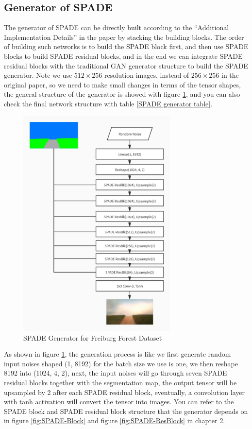 \subsection{Generator of SPADE}
The generator of SPADE can be directly built according to the “Additional Implementation Details”
in the paper \cite{park2019SPADE} by stacking the building blocks. The order of building 
such networks is to build the SPADE block first, and then use SPADE blocks to build SPADE residual 
blocks, and in the end we can integrate SPADE residual blocks with the traditional GAN generator 
structure to build the SPADE generator. Note we use $512\times256$ resolution images, 
instead of $256\times256$ in the original paper, so we need 
to make small changes in terms of the tensor shapes, 
the general structure of the generator is showed with figure \ref{fig:SPADE-imp-generator}, 
and you can also check the final network structure with table \ref{SPADE generator table}. 
\begin{figure}
    \begin{center}
    \includegraphics[width=8cm]{figures/SPADE-imp-generator}
    \end{center}
    \caption{SPADE Generator for Freiburg Forest Dataset}
    \label{fig:SPADE-imp-generator}
\end{figure} 

As shown in figure \ref{fig:SPADE-imp-generator}, the generation process is like we first 
generate random input noises shaped (1, 8192) for the batch size we use is one, we then 
reshape 8192 into (1024, 4, 2), next, the input noises will go through seven SPADE residual blocks 
together with the segmentation map, the output tensor will be upsampled 
by 2 after each SPADE residual block, eventually, a convolution layer with tanh activation 
will convert the tensor into images. You can refer to the SPADE block and SPADE residual block 
structure that the generator depends on in figure \ref{fig:SPADE-Block} and 
figure \ref{fig:SPADE-ResBlock} in chapter 2.
